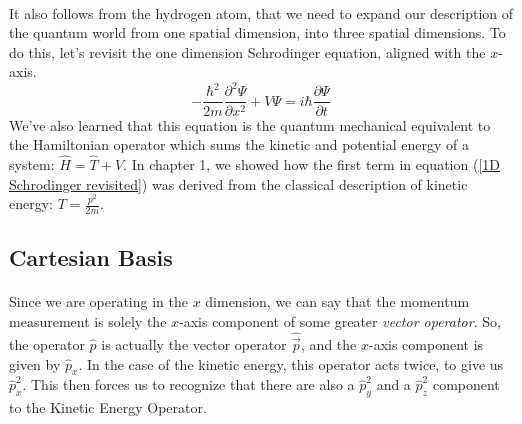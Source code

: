 \documentclass[12pt,letterpaper]{book}
\begin{document}
\paragraph{}It also follows from the hydrogen atom, that we need to expand our description of the quantum world from one spatial dimension, into three spatial dimensions. To do this, let's revisit the one dimension Schrodinger equation, aligned with the $x$-axis.
\begin{equation}
\label{1D Schrodinger revisited}
-\frac{\hbar^2}{2m}\frac{\partial^2\Psi}{\partial x^2} +
V\Psi = i\hbar\frac{\partial \Psi}{\partial t}
\end{equation}
We've also learned that this equation is the quantum mechanical equivalent to the Hamiltonian operator which sums the kinetic and potential energy of a system: $\hat{H} = \hat{T} + \hat{V}$. In chapter 1, we showed how the first term in equation (\ref{1D Schrodinger revisited}) was derived from the classical description of kinetic energy: $T = \frac{p^2}{2m}$.

\subsection*{Cartesian Basis}

\paragraph*{}Since we are operating in the $x$ dimension, we can say that the momentum measurement is solely the $x$-axis component of some greater \textit{vector operator}. So, the operator $\hat{p}$ is actually the vector operator $\hat{\vec{p}}$, and the $x$-axis component is given by $\hat{p}_x$. In the case of the kinetic energy, this operator acts twice, to give us $\hat{p}_x^2$. This then forces us to recognize that there are also a $\hat{p}_y^2$ and a $\hat{p}_z^2$ component to the Kinetic Energy Operator.
\end{document}
